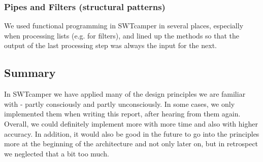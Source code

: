 \subsubsection{Pipes and Filters (structural patterns)}
We used functional programming in SWTcamper in several places, especially when processing lists (e.g. for filters), and lined up the methods so that the output of the last processing step was always the input for the next.

\subsection{Summary}
In SWTcamper we have applied many of the design principles we are familiar with - partly consciously and partly unconsciously. In some cases, we only implemented them when writing this report, after hearing from them again. Overall, we could definitely implement more with more time and also with higher accuracy. In addition, it would also be good in the future to go into the principles more at the beginning of the architecture and not only later on, but in retrospect we neglected that a bit too much.
